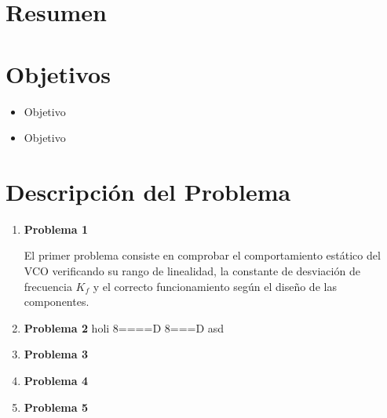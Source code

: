 \documentclass[letterpaper, titlepage]{article}
\begin{document}
\maketitle
\newpage
\section{Resumen}
\section{Objetivos}
	\begin{itemize}
		\item Objetivo
		\item Objetivo
	\end{itemize}
\newpage

\section{Descripción del Problema}
	\begin{enumerate}
		\item \textbf{Problema 1}
		
		El primer problema consiste en comprobar el comportamiento estático del VCO verificando su rango de linealidad, la constante de desviación de frecuencia $K_f$ y el correcto funcionamiento según el diseño de las componentes.
		\item \textbf{Problema 2}
		holi 8====D 8===D
		asd
		\item \textbf{Problema 3}
		
		\item \textbf{Problema 4}
		
		\item \textbf{Problema 5}
	\end{enumerate}
\newpage
\end{document}
